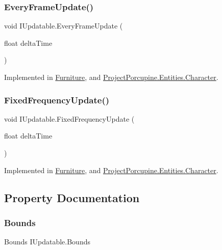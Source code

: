 \subsubsection{\texorpdfstring{Every\+Frame\+Update()}{EveryFrameUpdate()}}
{\footnotesize\ttfamily void I\+Updatable.\+Every\+Frame\+Update (\begin{DoxyParamCaption}\item[{float}]{delta\+Time }\end{DoxyParamCaption})}



Implemented in \hyperlink{class_furniture_ad44ee227637d74afa5636c9610ec8dbc}{Furniture}, and \hyperlink{class_project_porcupine_1_1_entities_1_1_character_ae3c85ddd163fbb4680572fb03e7fc6fc}{Project\+Porcupine.\+Entities.\+Character}.

\mbox{\label{interface_i_updatable_a360da1e579ac8d1ed8adb700176cc45f}} 
\subsubsection{\texorpdfstring{Fixed\+Frequency\+Update()}{FixedFrequencyUpdate()}}
{\footnotesize\ttfamily void I\+Updatable.\+Fixed\+Frequency\+Update (\begin{DoxyParamCaption}\item[{float}]{delta\+Time }\end{DoxyParamCaption})}



Implemented in \hyperlink{class_furniture_af86f663d0e91858a85de20149a0188e5}{Furniture}, and \hyperlink{class_project_porcupine_1_1_entities_1_1_character_a9ac39404237d8a6f3da2688bc4ab9c13}{Project\+Porcupine.\+Entities.\+Character}.



\subsection{Property Documentation}
\mbox{\label{interface_i_updatable_ac7839b3d04c62fc6b04c4ece5d5beea3}} 
\subsubsection{\texorpdfstring{Bounds}{Bounds}}
{\footnotesize\ttfamily Bounds I\+Updatable.\+Bounds\hspace{0.3cm}{\ttfamily [get]}}



